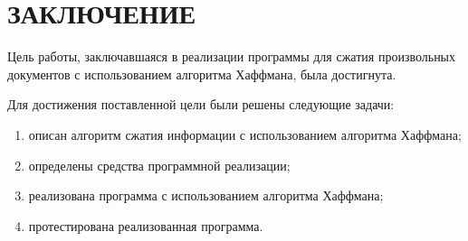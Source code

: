 \chapter*{\hfill{\centering  ЗАКЛЮЧЕНИЕ}\hfill}

Цель работы, заключавшаяся в реализации программы для сжатия произвольных документов с использованием алгоритма Хаффмана, была достигнута.

Для достижения поставленной цели были решены следующие задачи:
\begin{enumerate}
	\item описан алгоритм сжатия информации с использованием алгоритма Хаффмана;
	\item определены средства программной реализации;
	\item реализована программа с использованием алгоритма Хаффмана;
	\item протестирована реализованная программа.
\end{enumerate}